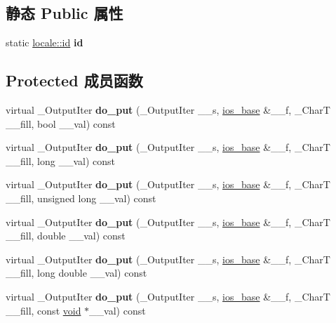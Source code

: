 \subsection*{静态 Public 属性}
\begin{DoxyCompactItemize}
\item 
\mbox{\label{classnum__put_a513d32d76e15cc3d222ab25ae1a3c1e3}} 
static \hyperlink{classlocale_1_1id}{locale\+::id} {\bfseries id}
\end{DoxyCompactItemize}
\subsection*{Protected 成员函数}
\begin{DoxyCompactItemize}
\item 
\mbox{\label{classnum__put_ae330119517348592d9eced63ed80eb9d}} 
virtual \+\_\+\+Output\+Iter {\bfseries do\+\_\+put} (\+\_\+\+Output\+Iter \+\_\+\+\_\+s, \hyperlink{classios__base}{ios\+\_\+base} \&\+\_\+\+\_\+f, \+\_\+\+CharT \+\_\+\+\_\+fill, bool \+\_\+\+\_\+val) const
\item 
\mbox{\label{classnum__put_a6d73977ed17b6d8be2dc79daef8dbedb}} 
virtual \+\_\+\+Output\+Iter {\bfseries do\+\_\+put} (\+\_\+\+Output\+Iter \+\_\+\+\_\+s, \hyperlink{classios__base}{ios\+\_\+base} \&\+\_\+\+\_\+f, \+\_\+\+CharT \+\_\+\+\_\+fill, long \+\_\+\+\_\+val) const
\item 
\mbox{\label{classnum__put_a8a23220e0f7271c58af857b3da1d42c1}} 
virtual \+\_\+\+Output\+Iter {\bfseries do\+\_\+put} (\+\_\+\+Output\+Iter \+\_\+\+\_\+s, \hyperlink{classios__base}{ios\+\_\+base} \&\+\_\+\+\_\+f, \+\_\+\+CharT \+\_\+\+\_\+fill, unsigned long \+\_\+\+\_\+val) const
\item 
\mbox{\label{classnum__put_a8209c2036d1a432ea6fd5b8639d5a361}} 
virtual \+\_\+\+Output\+Iter {\bfseries do\+\_\+put} (\+\_\+\+Output\+Iter \+\_\+\+\_\+s, \hyperlink{classios__base}{ios\+\_\+base} \&\+\_\+\+\_\+f, \+\_\+\+CharT \+\_\+\+\_\+fill, double \+\_\+\+\_\+val) const
\item 
\mbox{\label{classnum__put_ac98c9eb03b7ef8719317c46c5cd6102c}} 
virtual \+\_\+\+Output\+Iter {\bfseries do\+\_\+put} (\+\_\+\+Output\+Iter \+\_\+\+\_\+s, \hyperlink{classios__base}{ios\+\_\+base} \&\+\_\+\+\_\+f, \+\_\+\+CharT \+\_\+\+\_\+fill, long double \+\_\+\+\_\+val) const
\item 
\mbox{\label{classnum__put_a6e339d02abeea66c9c0d327976eb6969}} 
virtual \+\_\+\+Output\+Iter {\bfseries do\+\_\+put} (\+\_\+\+Output\+Iter \+\_\+\+\_\+s, \hyperlink{classios__base}{ios\+\_\+base} \&\+\_\+\+\_\+f, \+\_\+\+CharT \+\_\+\+\_\+fill, const \hyperlink{interfacevoid}{void} $\ast$\+\_\+\+\_\+val) const
\end{DoxyCompactItemize}


